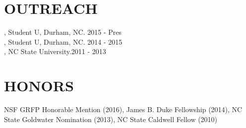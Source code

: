 \documentclass[resmargin, 11pt]{resume_style_class} %
\begin{document}
\begin{resume}

\section{OUTREACH}
\raggedright 
{}, Student U, Durham, NC. \hfill 2015 - Pres \\
, Student U, Durham, NC. \hfill 2014 - 2015 \\
, NC State University.\hfill 2011 - 2013  

\section{HONORS}
NSF GRFP Honorable Mention (2016),
James B. Duke Fellowship (2014),
NC State Goldwater Nomination (2013),
NC State Caldwell Fellow (2010)
\end{resume}
\end{document}

